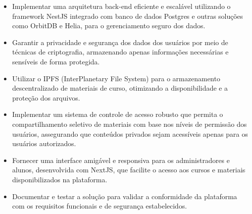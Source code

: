 \begin{itemize}
    \item Implementar uma arquitetura back-end eficiente e escalável utilizando o framework NestJS integrado com banco de dados Postgres e outras soluções como OrbitDB e Helia, para o gerenciamento seguro dos dados.
    \item Garantir a privacidade e segurança dos dados dos usuários por meio de técnicas de criptografia, armazenando apenas informações necessárias e sensíveis de forma protegida.
    \item Utilizar o IPFS (InterPlanetary File System) para o armazenamento descentralizado de materiais de curso, otimizando a disponibilidade e a proteção dos arquivos.
    \item Implementar um sistema de controle de acesso robusto que permita o compartilhamento seletivo de materiais com base nos níveis de permissão dos usuários, assegurando que conteúdos privados sejam acessíveis apenas para os usuários autorizados.
    \item Fornecer uma interface amigável e responsiva para os administradores e alunos, desenvolvida com NextJS, que facilite o acesso aos cursos e materiais disponibilizados na plataforma.
    \item Documentar e testar a solução para validar a conformidade da plataforma com os requisitos funcionais e de segurança estabelecidos.
\end{itemize}
  